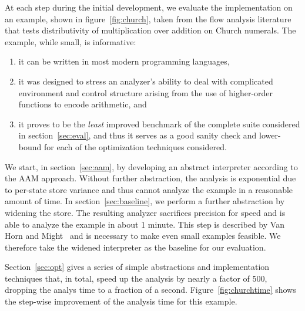 \documentclass[preprint,onecolumn,9pt]{sigplanconf} %
\begin{document}
At each step during the initial development, we evaluate the
implementation on an example, shown in figure~\ref{fig:church}, taken
from the flow analysis literature~\cite{dvanhorn:Vardoulakis2011CFA2}
that tests distributivity of multiplication over addition on Church
numerals.
The example, while small, is informative:
\begin{enumerate}
\item it can be written in most modern programming languages,
%
\item it was designed to stress an analyzer's ability to deal with
  complicated environment and control structure arising from the use
  of higher-order functions to encode arithmetic, and
%
\item it proves to be the \emph{least} improved benchmark of the
  complete suite considered in section~\ref{sec:eval}, and thus it
  serves as a good sanity check and lower-bound for each of the
  optimization techniques considered.
\end{enumerate}

We start, in section~\ref{sec:aam}, by developing an abstract
interpreter according to the AAM approach.  Without further
abstraction, the analysis is exponential due to per-state store
variance and thus cannot analyze the example in a reasonable amount of
time.  In section~\ref{sec:baseline}, we perform a further abstraction
by widening the store.  The resulting analyzer sacrifices precision
for speed and is able to analyze the example in about 1 minute.  This
step is described by Van Horn and Might~\cite[\S
  3.5--6]{dvanhorn:VanHorn2012Systematic} and is necessary to make
even small examples feasible.  We therefore take the widened
interpreter as the baseline for our evaluation.

Section~\ref{sec:opt} gives a series of simple abstractions and
implementation techniques that, in total, speed up the analysis by
nearly a factor of 500, dropping the analys time to a fraction of a
second.  Figure~\ref{fig:churchtime} shows the step-wise improvement
of the analysis time for this example.
\end{document}
